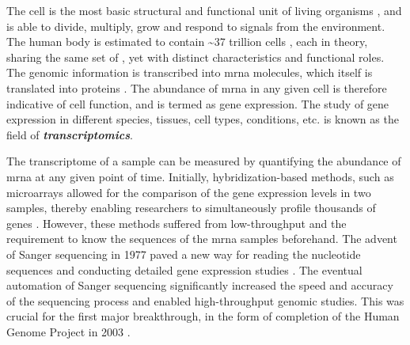 \par The cell is the most basic structural and functional unit of living organisms \textbf{\cite{regev_human_2017}}, and is able to divide, multiply, grow and respond to signals from the environment. The human body is estimated to contain \textasciitilde37 trillion cells \textbf{\cite{wen_recent_2022}}, each in theory, sharing the same set of , yet with distinct characteristics and functional roles. The genomic information is transcribed into \gls{mrna} molecules, which itself is translated into proteins \textbf{\cite{costa_uncovering_2010}}. The abundance of \gls{mrna} in any given cell is therefore indicative of cell function, and is termed as gene expression. The study of gene expression in different species, tissues, cell types, conditions, etc. is known as the field of \textit{\textbf{transcriptomics}}.\\

\par The transcriptome of a sample can be measured by quantifying the abundance of \gls{mrna} at any given point of time. Initially, hybridization-based methods, such as microarrays allowed for the comparison of the gene expression levels in two samples, thereby enabling researchers to simultaneously profile thousands of genes \textbf{\cite{lockhart_expression_1996,schena_quantitative_1995}}. However, these methods suffered from low-throughput and the requirement to know the sequences of the \gls{mrna} samples beforehand. The advent of Sanger sequencing in 1977 paved a new way for reading the nucleotide sequences and conducting detailed gene expression studies \textbf{\cite{sanger_dna_1977}}. The eventual automation of Sanger sequencing significantly increased the speed and accuracy of the sequencing process and enabled high-throughput genomic studies. This was crucial for the first major breakthrough, in the form of completion of the Human Genome Project in 2003 \textbf{\cite{collins_human_2003}}.\\

